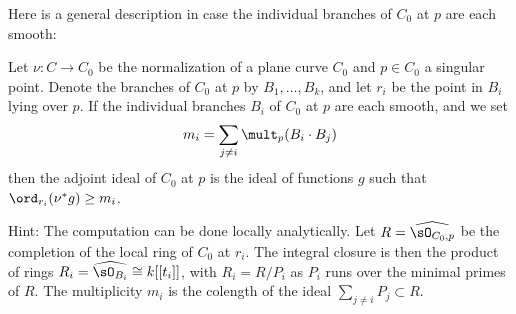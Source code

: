Here is a  general description in case the individual branches of $C_0$ at $p$ are each smooth:

\begin{exercise}
Let $\nu : C \to C_0$ be the normalization of a plane curve $C_0$ and $p \in C_0$ a singular point. Denote the branches of $C_0$ at $p$ by $B_1,\dots,B_k$, and let $r_i$ be the point in $B_i$ lying over $p$. If the individual branches $B_i$ of $C_0$ at $p$ are each smooth, and we set
$$
m_i = \sum_{j \neq i} \mult_p(B_i \cdot B_j)
$$
then the adjoint ideal of $C_0$ at $p$ is the ideal of functions $g$ such that $\ord_{r_i}(\nu^*g) \geq m_i$.

Hint: The computation can be done locally analytically. Let $R = \widehat{\sO_{C_0, p}}$ be the completion of the local ring
of $C_0$ at $r_i$. The integral closure is then the product of rings $R_i = \widehat{\sO_{B_i}} \cong k[[t_i]]$,
with $R_i = R/P_i$ as $P_i$ runs over the minimal primes of $R$. The multiplicity
$m_i$ is the colength of the ideal $\sum_{j\neq i}P_j \subset R$.
\end{exercise}


